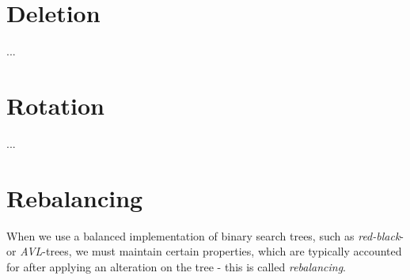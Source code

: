 \section{Deletion}
...


\section{Rotation}
...


\section{Rebalancing}
When we use a balanced implementation of binary search trees, such as
\textit{red-black}- or \textit{AVL}-trees, we must maintain certain
properties, which are typically accounted for after applying an alteration on
the tree - this is called \textit{rebalancing}.

